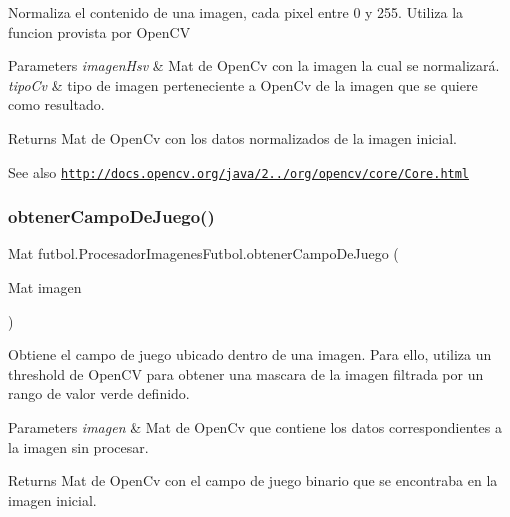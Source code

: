 Normaliza el contenido de una imagen, cada pixel entre 0 y 255. Utiliza la funcion provista por Open\+CV 
\begin{DoxyParams}{Parameters}
{\em imagen\+Hsv} & Mat de Open\+Cv con la imagen la cual se normalizará. \\
\hline
{\em tipo\+Cv} & tipo de imagen perteneciente a Open\+Cv de la imagen que se quiere como resultado. \\
\hline
\end{DoxyParams}
\begin{DoxyReturn}{Returns}
Mat de Open\+Cv con los datos normalizados de la imagen inicial. 
\end{DoxyReturn}
\begin{DoxySeeAlso}{See also}
\href{http://docs.opencv.org/java/2.4.2/org/opencv/core/Core.html}{\tt http\+://docs.\+opencv.\+org/java/2../org/opencv/core/\+Core.\+html} 
\end{DoxySeeAlso}
\hypertarget{classfutbol_1_1_procesador_imagenes_futbol_a1478fb4d97f9f1c5ce7da65559d9d9bd}{}\label{classfutbol_1_1_procesador_imagenes_futbol_a1478fb4d97f9f1c5ce7da65559d9d9bd} 
\subsubsection{\texorpdfstring{obtener\+Campo\+De\+Juego()}{obtenerCampoDeJuego()}}
{\footnotesize\ttfamily Mat futbol.\+Procesador\+Imagenes\+Futbol.\+obtener\+Campo\+De\+Juego (\begin{DoxyParamCaption}\item[{Mat}]{imagen }\end{DoxyParamCaption})\hspace{0.3cm}{\ttfamily [private]}}

Obtiene el campo de juego ubicado dentro de una imagen. Para ello, utiliza un threshold de Open\+CV para obtener una mascara de la imagen filtrada por un rango de valor verde definido. 
\begin{DoxyParams}{Parameters}
{\em imagen} & Mat de Open\+Cv que contiene los datos correspondientes a la imagen sin procesar. \\
\hline
\end{DoxyParams}
\begin{DoxyReturn}{Returns}
Mat de Open\+Cv con el campo de juego binario que se encontraba en la imagen inicial. 
\end{DoxyReturn}
\hypertarget{classfutbol_1_1_procesador_imagenes_futbol_a391d5d1edbda46b9de5abdef7280147c}{}\label{classfutbol_1_1_procesador_imagenes_futbol_a391d5d1edbda46b9de5abdef7280147c} 
